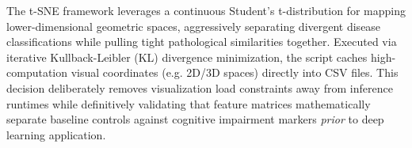 The t-SNE framework leverages a continuous Student's t-distribution for mapping lower-dimensional geometric spaces, aggressively separating divergent disease classifications while pulling tight pathological similarities together. Executed via iterative Kullback-Leibler (KL) divergence minimization, the script caches high-computation visual coordinates (e.g. 2D/3D spaces) directly into CSV files. This decision deliberately removes visualization load constraints away from inference runtimes while definitively validating that feature matrices mathematically separate baseline controls against cognitive impairment markers \textit{prior} to deep learning application.
